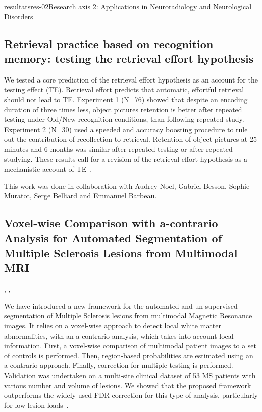 \documentclass{ra2018}
\begin{document}
\begin{module}{resultats}{res-02}{Research axis 2: Applications in Neuroradiology and Neurological Disorders}
\subsection{Retrieval practice based on recognition memory: testing the retrieval effort hypothesis}
\begin{participants}
\end{participants}
We tested a core prediction of the retrieval effort hypothesis as an account for the testing effect (TE). Retrieval effort predicts that automatic, effortful retrieval should not lead to TE. Experiment 1 (N=76) showed that despite an encoding duration of three times less, object pictures retention is better after repeated testing under Old/New recognition conditions, than following repeated study. Experiment 2 (N=30) used a speeded and accuracy boosting procedure to rule out the contribution of recollection to retrieval. Retention of object pictures at 25 minutes and 6 months was similar after repeated testing or after repeated studying. These results call for a revision of the retrieval effort hypothesis as a mechanistic account of TE~\cite{jonin:inserm-01939069}.

This work was done in collaboration with Audrey Noel, Gabriel Besson, Sophie Muratot, Serge Belliard and Emmanuel Barbeau.


\subsection{Voxel-wise Comparison with a-contrario Analysis for Automated Segmentation of Multiple Sclerosis Lesions from Multimodal MRI}
\begin{participants}
      ,
      ,
\end{participants}
We have introduced a new framework for the automated and un-supervised segmentation of Multiple Sclerosis lesions from multimodal Magnetic Resonance images. It relies on a voxel-wise approach to detect local white matter abnormalities, with an a-contrario analysis, which takes into account local information. First, a voxel-wise comparison of multimodal patient images to a set of controls is performed. Then, region-based probabilities are estimated using an a-contrario approach. Finally, correction for multiple testing is performed. Validation was undertaken on a multi-site clinical dataset of 53 MS patients with various number and volume of lesions. We showed that the proposed framework outperforms the widely used FDR-correction for this type of analysis, particularly for low lesion loads~\cite{galassi:inserm-01888928}.


\end{module}
\end{document}
